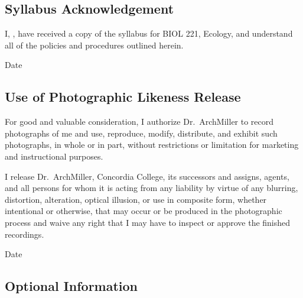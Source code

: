 \documentclass{tufte-handout}
\begin{document}
\newpage

\subsection{Syllabus Acknowledgement}

I, \underline{\hspace{5cm}}, have received a copy of the syllabus for BIOL 221, Ecology, and understand all of the policies and procedures outlined herein. 

  \underline{\hspace{5cm}} {Date}  \hrulefill


\subsection{Use of Photographic Likeness Release}

For good and valuable consideration, I authorize Dr.~ArchMiller to record photographs of me and use, reproduce, modify, distribute, and exhibit such photographs, in whole or in part, without restrictions or limitation for marketing and instructional purposes. 

I release Dr.~ArchMiller, Concordia College, its successors and assigns, agents, and all persons for whom it is acting from any liability by virtue of any blurring, distortion, alteration, optical illusion, or use in composite form, whether intentional or otherwise, that may occur or be produced in the photographic process and waive any right that I may have to inspect or approve the finished recordings.

  \hrulefill
{}  \underline{\hspace{5cm}} {Date}  \hrulefill

\subsection{Optional Information}

 \hrulefill

 \hrulefill

 \hrulefill

 \hrulefill


 \hrulefill

\hrulefill

\hrulefill

\hrulefill

\hrulefill

\hrulefill
\end{document}
